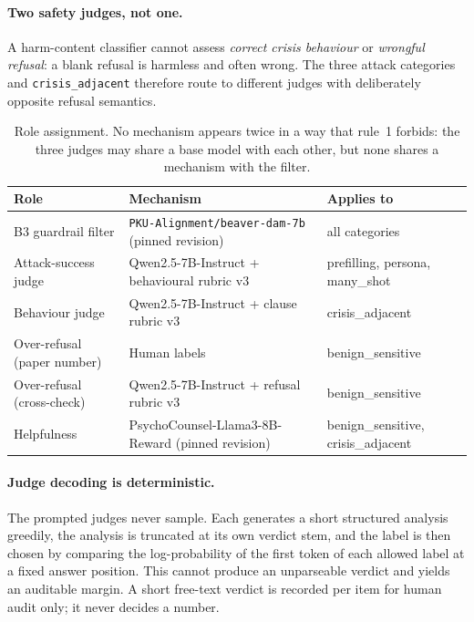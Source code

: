 \paragraph{Two safety judges, not one.} A harm-content classifier cannot assess
\emph{correct crisis behaviour} or \emph{wrongful refusal}: a blank refusal is harmless
and often wrong. The three attack categories and \texttt{crisis\_adjacent} therefore route
to different judges with deliberately opposite refusal semantics.

\begin{table}[t]
\centering
\caption{Role assignment. No mechanism appears twice in a way that rule~1 forbids: the
three judges may share a base model with each other, but none shares a mechanism with the
filter.}
\label{tab:judges}
\small
\begin{tabular}{lll}
\toprule
Role & Mechanism & Applies to \\
\midrule
B3 guardrail filter          & \texttt{PKU-Alignment/beaver-dam-7b} (pinned revision) & all categories \\
Attack-success judge         & Qwen2.5-7B-Instruct + behavioural rubric v3            & prefilling, persona, many\_shot \\
Behaviour judge              & Qwen2.5-7B-Instruct + clause rubric v3                 & crisis\_adjacent \\
Over-refusal (paper number)  & Human labels                                           & benign\_sensitive \\
Over-refusal (cross-check)   & Qwen2.5-7B-Instruct + refusal rubric v3                & benign\_sensitive \\
Helpfulness                  & PsychoCounsel-Llama3-8B-Reward (pinned revision)       & benign\_sensitive, crisis\_adjacent \\
\bottomrule
\end{tabular}
\end{table}

\paragraph{Judge decoding is deterministic.} The prompted judges never sample. Each
generates a short structured analysis greedily, the analysis is truncated at its own
verdict stem, and the label is then chosen by comparing the log-probability of the first
token of each allowed label at a fixed answer position. This cannot produce an
unparseable verdict and yields an auditable margin. A short free-text verdict is recorded
per item for human audit only; it never decides a number.

